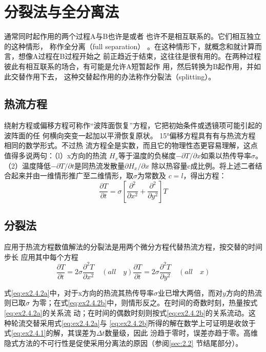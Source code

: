 \section{分裂法与全分离法}
\label{sec:2.4}
通常同时起作用的两个过程A与B也许是或者
也许不是相互联系的。它们相互独立的这种情形， 称作全分离（full separation）
。在这种情形下，就概念和就计算而言，想像A过程在B过程开始之
前正趋近于结束，这往往是很有用的。在两种过程
彼此有相互联系的场合，有可能是允许A短暂起作
用，然后转换为B起作用，并如此交替作用下去，
这种交替起作用的办法称作分裂法（splitting）。

\subsection{热流方程}
\label{sec:2.4.1}
绕射方程或偏移方程可称作“波阵面恢复”方程，它把初始条件或透镜项可能引起的波阵面的任
何横向突变一起加以平滑恢复原状。
15°偏移方程具有有与热流方程相同的数学形式。不过热
流方程全是实数，而且它的物理性态更容易理解，这点值得多说两句：（l）x方向的热流
$H_x$等于温度的负梯度$-\partial T/\partial x$如乘以热传导率$\sigma$。（2）温度降低$-\partial T/\partial t$是同热流发散量$\partial H_x/\partial x$
除以热容量c成比例。将上述二者结合起来并由一维情形推广至二维情形，取$\sigma$为常数及
$c=l$，得出方程：
\begin{equation}
\frac{\partial T}{\partial t}=\sigma[\frac{\partial^2}{\partial x^2}+\frac{\partial^2}{\partial y^2}]T
\label{eq:ex2.4.1}
\end{equation}

\subsection{分裂法}
\label{sec:2.4.2}
应用于热流方程数值解法的分裂法是用两个微分方程代替热流方程，按交替的时间步长
应用其中每个方程
\begin{subequations}
\begin{equation}
\frac{\partial T}{\partial t}=2\sigma\frac{\partial^2 T}{\partial x^2} \quad (all\quad y)
\label{eq:ex2.4.2a}
\end{equation}
\begin{equation}
\frac{\partial T}{\partial t}=2\sigma\frac{\partial^2 T}{\partial y^2} \quad (all\quad x)
\label{eq:ex2.4.2b}
\end{equation}
\label{eq:ex2.4.2}
\end{subequations}

式\ref{eq:ex2.4.2a}中，对于x方向的热流其热传导率$\sigma$业已增大两倍，而对$y$方向的热流则已取$\sigma$
为零；在式\ref{eq:ex2.4.2b}中，则情形反之。在时间的奇数时刻，热量按式\ref{eq:ex2.4.2a}的关系流
动；在时间的偶数时刻则按式\ref{eq:ex2.4.2b}的关系流动。这种轮流交替采用式\ref{eq:ex2.4.2a}与
\ref{eq:ex2.4.2b}所得的解在数学上可证明是收敛于式\ref{eq:ex2.4.1}的解，其误差为$\Delta t$数量级，因此
汾趋于零时，误差亦趋于零。高维隐式方法的不可行性是促使采用分离法的原因（参阅\ref{sec:2.2}
节结尾部分）。

